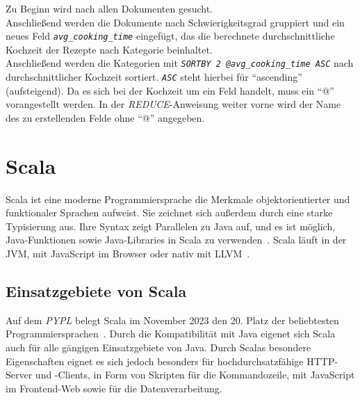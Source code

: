 Zu Beginn wird nach allen Dokumenten gesucht.\\
Anschließend werden die Dokumente nach Schwierigkeitsgrad gruppiert und ein neues Feld \emph{\texttt{avg\_cooking\_time}} eingefügt, das die berechnete durchschnittliche Kochzeit der Rezepte nach Kategorie beinhaltet.\\
Anschließend werden die Kategorien mit \emph{\texttt{SORTBY 2 @avg\_cooking\_time ASC}} nach durchschnittlicher Kochzeit sortiert.
\emph{\texttt{ASC}} steht hierbei für \enquote{ascending} (aufsteigend). Da es sich  bei der Kochzeit um ein Feld handelt, muss ein \enquote{@} vorangestellt werden. In der \emph{REDUCE}-Anweisung weiter vorne wird der Name des zu erstellenden Felde ohne \enquote{@} angegeben.





















\section{Scala} %
Scala ist eine moderne Programmiersprache die Merkmale objektorientierter und funktionaler Sprachen aufweist.
Sie zeichnet sich außerdem durch eine starke Typisierung aus.
Ihre Syntax zeigt Parallelen zu Java auf, und es ist möglich, Java-Funktionen sowie Java-Libraries in Scala zu verwenden~\cite{epfl_scala_nodate-1, epfl_introduction_nodate}.
Scala läuft in der JVM, mit JavaScript im Browser oder nativ mit LLVM~\cite{epfl_scala_nodate}.

\subsection{Einsatzgebiete von Scala}
Auf dem \emph{\acf{PYPL}} belegt Scala im November 2023 den 20. Platz der beliebtesten Programmiersprachen~\cite{carbonnelle_pypl_2023}.
Durch die Kompatibilität mit Java eigenet sich Scala auch für alle gängigen Einsatzgebiete von Java. 
Durch Scalas besondere Eigenschaften eignet es sich jedoch besonders für hochdurchsatzfähige HTTP-Server und -Clients, in Form von Skripten für die Kommandozeile, mit JavaScript im Frontend-Web sowie für die Datenverarbeitung.

